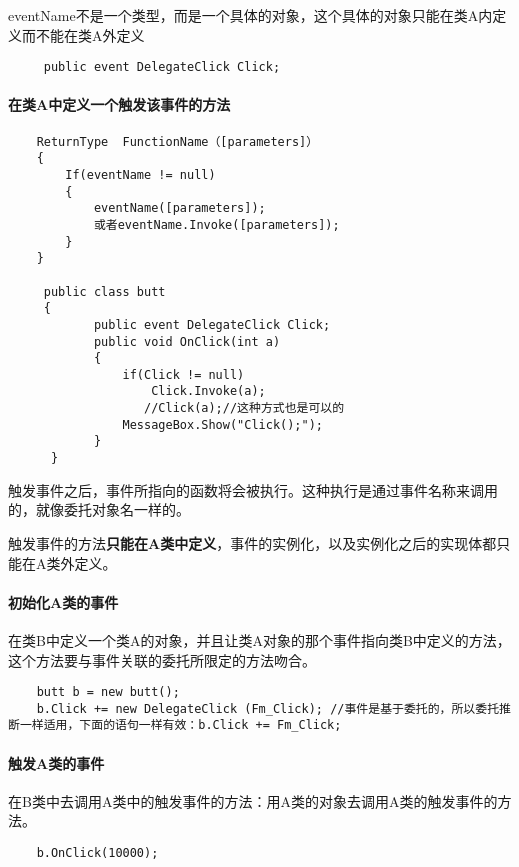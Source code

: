 \documentclass[UTF8,a4paper,12pt]{ctexbook}
\begin{document}
				eventName不是一个类型，而是一个具体的对象，这个具体的对象只能在类A内定义而不能在类A外定义
				
				\begin{lstlisting}
	 public event DelegateClick Click;
				\end{lstlisting}
				
			\paragraph{在类A中定义一个触发该事件的方法}
				
				\begin{lstlisting}
	ReturnType  FunctionName（[parameters]）	
	{
		If(eventName != null)
		{
			eventName([parameters]);
			或者eventName.Invoke([parameters]);
		}
	}
	
	 public class butt
	 {
	        public event DelegateClick Click;
	        public void OnClick(int a)
	        {
	            if(Click != null)
	                Click.Invoke(a);
	               //Click(a);//这种方式也是可以的
	            MessageBox.Show("Click();");
	        }
	  }
				\end{lstlisting}
			
				触发事件之后，事件所指向的函数将会被执行。这种执行是通过事件名称来调用的，就像委托对象名一样的。
				
				触发事件的方法\textbf{只能在A类中定义}，事件的实例化，以及实例化之后的实现体都只能在A类外定义。
				
			\paragraph{初始化A类的事件}
				在类B中定义一个类A的对象，并且让类A对象的那个事件指向类B中定义的方法，这个方法要与事件关联的委托所限定的方法吻合。
			
				\begin{lstlisting}
	butt b = new butt();
	b.Click += new DelegateClick (Fm_Click); //事件是基于委托的，所以委托推断一样适用，下面的语句一样有效：b.Click += Fm_Click;
				\end{lstlisting}
				
			\paragraph{触发A类的事件}
				在B类中去调用A类中的触发事件的方法：用A类的对象去调用A类的触发事件的方法。
				\begin{lstlisting}
	b.OnClick(10000);    
				\end{lstlisting}
			
\end{document}
